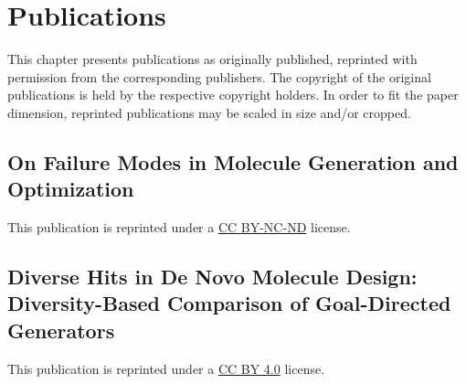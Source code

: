 
\chapter{Publications\label{chap:publications}}
This chapter presents publications as originally published, reprinted with permission
from the corresponding publishers. The copyright of the original publications is held
by the respective copyright holders. In order to fit the paper dimension, reprinted
publications may be scaled in size and/or cropped.

\clearpage
\thispagestyle{plain}
\section{On Failure Modes in Molecule Generation and Optimization\label{sec:failure-modes}}
This publication is reprinted under a \href{https://creativecommons.org/licenses/by-nc-nd/4.0/}{CC BY-NC-ND} license.
\ifx\skippdf\undefined
    
    
\fi


\clearpage
\thispagestyle{plain}
\section{Diverse Hits in De Novo Molecule Design: Diversity-Based Comparison of Goal-Directed Generators\label{sec:diverse-hits}}
This publication is reprinted under a \href{https://creativecommons.org/licenses/by/4.0/}{CC BY 4.0} license.

\ifx\skippdf\undefined
    

    
\fi


